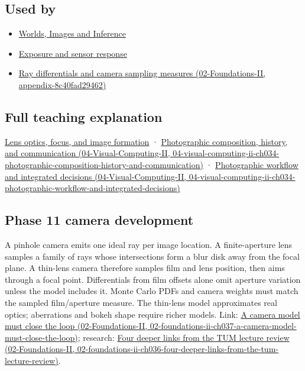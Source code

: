 \subsection{Used by}\label{appendix-21f8456e2629-used-by}

\begin{itemize}
\item
  \href{Continuous\%20Notes/University\%20-\%20Worlds,\%20Images\%20and\%20Inference\%20-\%20Graphics,\%20Vision\%20and\%20Photography}{Worlds, Images and Inference}
\item
  \hyperref[appendix-92d45cdf2afc]{Exposure and sensor response}
\item
  \href{../02-Foundations-II/main.pdf\#nameddest=appendix-8c40fad29462}{Ray differentials and camera sampling measures (02-Foundations-II, appendix-8c40fad29462)}
\end{itemize}

\subsection{Full teaching explanation}\label{appendix-21f8456e2629-full-teaching-explanation}

\hyperref[03-visual-computing-i-ch003-lens-optics-focus-and-image-formation]{Lens optics, focus, and image formation} · \href{../04-Visual-Computing-II/main.pdf\#nameddest=04-visual-computing-ii-ch034-photographic-composition-history-and-communication}{Photographic composition, history, and communication (04-Visual-Computing-II, 04-visual-computing-ii-ch034-photographic-composition-history-and-communication)} · \href{../04-Visual-Computing-II/main.pdf\#nameddest=04-visual-computing-ii-ch034-photographic-workflow-and-integrated-decisions}{Photographic workflow and integrated decisions (04-Visual-Computing-II, 04-visual-computing-ii-ch034-photographic-workflow-and-integrated-decisions)}

\subsection{Phase 11 camera development}\label{appendix-21f8456e2629-phase-11-camera-development}

A pinhole camera emits one ideal ray per image location. A finite-aperture lens samples a family of rays whose intersections form a blur disk away from the focal plane. A thin-lens camera therefore samples film and lens position, then aims through a focal point. Differentials from film offsets alone omit aperture variation unless the model includes it. Monte Carlo PDFs and camera weights must match the sampled film/aperture measure. The thin-lens model approximates real optics; aberrations and bokeh shape require richer models. Link: \href{../02-Foundations-II/main.pdf\#nameddest=02-foundations-ii-ch037-a-camera-model-must-close-the-loop}{A camera model must close the loop (02-Foundations-II, 02-foundations-ii-ch037-a-camera-model-must-close-the-loop)}; research: \href{../02-Foundations-II/main.pdf\#nameddest=02-foundations-ii-ch036-four-deeper-links-from-the-tum-lecture-review}{Four deeper links from the TUM lecture review (02-Foundations-II, 02-foundations-ii-ch036-four-deeper-links-from-the-tum-lecture-review)}.
